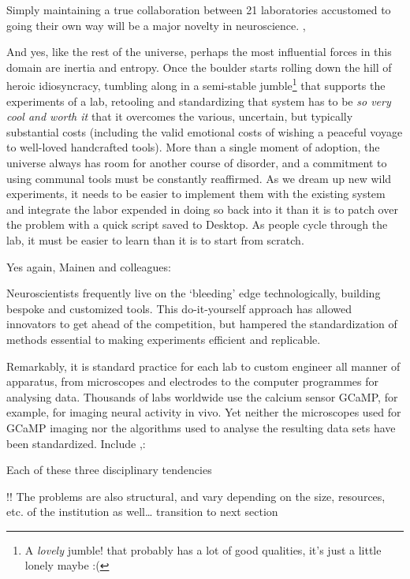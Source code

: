 \documentclass{article}
\begin{document}
\begin{leftbar}
Simply maintaining a true collaboration between 21 laboratories
accustomed to going their own way will be a major novelty in
neuroscience. \cite{abbottInternationalLaboratorySystems2017},\end{leftbar}
And yes, like the rest of the universe, perhaps the most influential
forces in this domain are inertia and entropy. Once the boulder starts
rolling down the hill of heroic idiosyncracy, tumbling along in a
semi-stable jumble\footnote{A \emph{lovely} jumble! that probably has a
  lot of good qualities, it's just a little lonely maybe :(} that
supports the experiments of a lab, retooling and standardizing that
system has to be \emph{so very cool and worth it} that it overcomes the
various, uncertain, but typically substantial costs (including the valid
emotional costs of wishing a peaceful voyage to well-loved handcrafted
tools). More than a single moment of adoption, the universe always has
room for another course of disorder, and a commitment to using communal
tools must be constantly reaffirmed. As we dream up new wild
experiments, it needs to be easier to implement them with the existing
system and integrate the labor expended in doing so back into it than it
is to patch over the problem with a quick script saved to Desktop. As
people cycle through the lab, it must be easier to learn than it is to
start from scratch.

Yes again, Mainen and colleagues:

\begin{leftbar}
Neuroscientists frequently live on the `bleeding' edge technologically,
building bespoke and customized tools. This do-it-yourself approach has
allowed innovators to get ahead of the competition, but hampered the
standardization of methods essential to making experiments efficient and
replicable.

Remarkably, it is standard practice for each lab to custom engineer all
manner of apparatus, from microscopes and electrodes to the computer
programmes for analysing data. Thousands of labs worldwide use the
calcium sensor GCaMP, for example, for imaging neural activity in vivo.
Yet neither the microscopes used for GCaMP imaging nor the algorithms
used to analyse the resulting data sets have been standardized. Include
\cite{mainenBetterWayCrack2016},:\end{leftbar}

Each of these three disciplinary tendencies

!! The problems are also structural, and vary depending on the size,
resources, etc. of the institution as well\ldots{} transition to next
section
\end{document}
